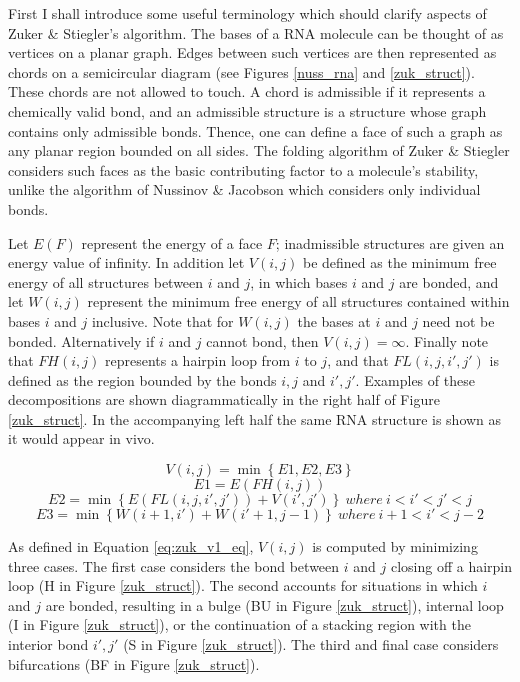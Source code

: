 \documentclass[12pt, a4paper]{article}
\begin{document}
First I shall introduce some useful terminology which should clarify aspects of Zuker \& Stiegler’s
algorithm. The bases of a RNA molecule can be thought of as vertices on a planar graph. Edges between such vertices are then represented as chords on a semicircular diagram (see Figures \ref{nuss_rna} and \ref{zuk_struct}). These chords are not allowed to touch. A chord
is admissible if it represents a chemically valid bond, and an
admissible structure is a structure whose graph contains only admissible bonds. Thence, one can define a face of such a graph as any planar region bounded on all sides. The folding algorithm of Zuker \& Stiegler considers such faces as the basic contributing factor to a molecule's stability, unlike the algorithm of Nussinov \& Jacobson
which considers only individual bonds.


Let $E(F)$ represent the energy of a face $F$; inadmissible structures are given an energy value of infinity. In addition let $V(i, j)$ be defined as the minimum free energy of all structures between $i$ and $j$, in which bases $i$ and $j$ are bonded, and let $W(i, j)$ represent the minimum free energy of all structures contained within bases $i$ and $j$ inclusive.
Note that for $W(i, j)$ the bases at $i$ and $j$ need not be bonded. Alternatively if $i$ and $j$ cannot bond, then $V(i, j) = \infty $. Finally note that $FH(i, j)$ represents a
hairpin loop from $i$ to $j$, and that $FL(i, j, i' , j' )$ is defined as the region
bounded by the bonds $i, j$ and $i', j'$. Examples of these decompositions are shown
diagrammatically in the right half of Figure \ref{zuk_struct}. In the accompanying left
half the same RNA structure is shown as it would appear in vivo.

\begin{equation} \label{eq:zuk_v1_eq}
V(i, j) = \min \left\lbrace E1, E2, E3 \right\rbrace
\end{equation}
$$E1 = E(FH(i, j))$$
$$E2 = \min \left\lbrace E(FL(i, j, i', j')) + V (i', j') \right\rbrace \: where \: i < i' < j' < j$$
$$E3 = \min \left\lbrace W (i + 1, i') + W (i' + 1, j - 1) \right\rbrace \: where \: i + 1 < i' < j - 2$$


As defined in Equation \ref{eq:zuk_v1_eq}, $V(i, j)$ is computed by minimizing
three cases. The first case considers the bond between $i$ and $j$ closing off a hairpin
loop (H in Figure \ref{zuk_struct}). The second accounts for situations in which $i$ and $j$ are bonded, resulting in a bulge (BU in Figure \ref{zuk_struct}), internal loop (I in Figure \ref{zuk_struct}), or the continuation of a stacking region with the
interior bond $i',j'$ (S in Figure \ref{zuk_struct}). The third and final case considers bifurcations
(BF in Figure \ref{zuk_struct}).
\end{document}
